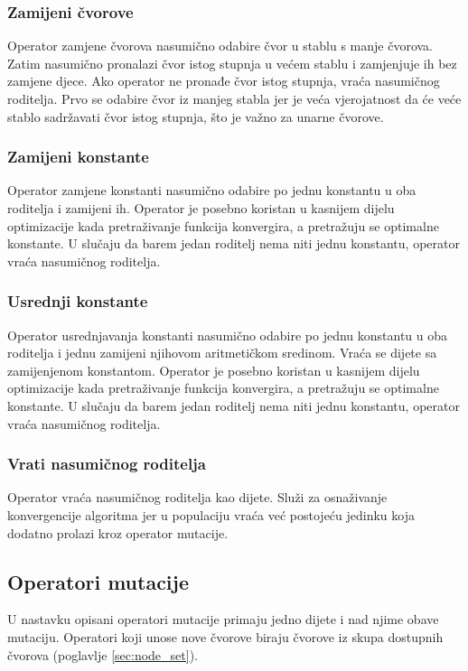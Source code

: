 \documentclass[times, utf8, numeric, diplomski]{fer}
\def\secref#1{(poglavlje \ref{#1})}
\begin{document}

\subsubsection{Zamijeni čvorove}
Operator zamjene čvorova nasumično odabire čvor u stablu s manje čvorova. Zatim nasumično pronalazi čvor istog stupnja u većem stablu i zamjenjuje ih bez zamjene djece. Ako operator ne pronađe čvor istog stupnja, vraća nasumičnog roditelja. Prvo se odabire čvor iz manjeg stabla jer je veća vjerojatnost da će veće stablo sadržavati čvor istog stupnja, što je važno za unarne čvorove.

\subsubsection{Zamijeni konstante}
Operator zamjene konstanti nasumično odabire po jednu konstantu u oba roditelja i zamijeni ih. Operator je posebno koristan u kasnijem dijelu optimizacije kada pretraživanje funkcija konvergira, a pretražuju se optimalne konstante. U slučaju da barem jedan roditelj nema niti jednu konstantu, operator vraća nasumičnog roditelja.

\subsubsection{Usrednji konstante}
Operator usrednjavanja konstanti nasumično odabire po jednu konstantu u oba roditelja i jednu zamijeni njihovom aritmetičkom sredinom. Vraća se dijete sa zamijenjenom konstantom. Operator je posebno koristan u kasnijem dijelu optimizacije kada pretraživanje funkcija konvergira, a pretražuju se optimalne konstante. U slučaju da barem jedan roditelj nema niti jednu konstantu, operator vraća nasumičnog roditelja.

\subsubsection{Vrati nasumičnog roditelja}
Operator vraća nasumičnog roditelja kao dijete. Služi za osnaživanje konvergencije algoritma jer u populaciju vraća već postojeću jedinku koja dodatno prolazi kroz operator mutacije.


\subsection{Operatori mutacije}
U nastavku opisani operatori mutacije primaju jedno dijete i nad njime obave mutaciju. Operatori koji unose nove čvorove biraju čvorove iz skupa dostupnih čvorova \secref{sec:node_set}.
\end{document}
